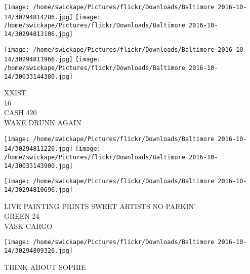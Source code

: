 \documentclass[10pt,letterpaper]{article}
\begin{document}
\texttt{[image: /home/swickape/Pictures/flickr/Downloads/Baltimore 2016-10-14/30294814286.jpg]}
\texttt{[image: /home/swickape/Pictures/flickr/Downloads/Baltimore 2016-10-14/30294813106.jpg]}

\texttt{[image: /home/swickape/Pictures/flickr/Downloads/Baltimore 2016-10-14/30294811966.jpg]}
\texttt{[image: /home/swickape/Pictures/flickr/Downloads/Baltimore 2016-10-14/30033144380.jpg]}

XXIST\\
16\\
CASH 420\\
WAKE DRUNK AGAIN\\
\pagebreak

\texttt{[image: /home/swickape/Pictures/flickr/Downloads/Baltimore 2016-10-14/30294811226.jpg]}
\texttt{[image: /home/swickape/Pictures/flickr/Downloads/Baltimore 2016-10-14/30033143900.jpg]}

\vspace{0.25in}
\texttt{[image: /home/swickape/Pictures/flickr/Downloads/Baltimore 2016-10-14/30294810696.jpg]}

LIVE PAINTING PRINTS SWEET ARTISTS NO PARKIN'\\
GREEN 24\\
VASK CARGO\\
\pagebreak

\texttt{[image: /home/swickape/Pictures/flickr/Downloads/Baltimore 2016-10-14/30294809326.jpg]}

THINK ABOUT SOPHIE\\
\pagebreak
\end{document}
